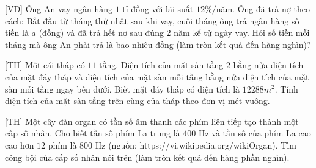 \begin{bt}%
 [VD] %
	Ông An vay ngân hàng $1$ tỉ đồng với lãi suất $12\%/$năm. Ông đã trả nợ theo cách: Bắt đầu từ tháng thứ nhất sau khi vay, cuối tháng ông trả ngân hàng số tiền là $a$ (đồng) và đã trả hết nợ sau đúng $2$ năm kể từ ngày vay. Hỏi số tiền mỗi tháng mà ông An phải trả là bao nhiêu đồng (làm tròn kết quả đến hàng nghìn)?
\end{bt}

\begin{bt}%
 [TH] %
	Một cái tháp có $11$ tầng. Diện tích của mặt sàn tầng $2$ bằng nửa diện tích của mặt đáy tháp và diện tích của mặt sàn mỗi tầng bằng nửa diện tích của mặt sàn mỗi tầng ngay bên dưới. Biết mặt đáy tháp có diện tích là $12 288m^2$. Tính diện tích của mặt sàn tầng trên cùng của tháp theo đơn vị mét vuông.
\end{bt}

\begin{bt}%
[TH] %
	Một cây đàn organ có tần số âm thanh các phím liên tiếp tạo thành một cấp số nhân. Cho biết tần số phím La trung là $400$ Hz và tần số của phím La cao cao hơn $12$ phím là $800$ Hz (nguồn: https://vi.wikipedia.org/wikiOrgan). Tìm công bội của cấp số nhân nói trên (làm tròn kết quả đến hàng phần nghìn).
\end{bt}


